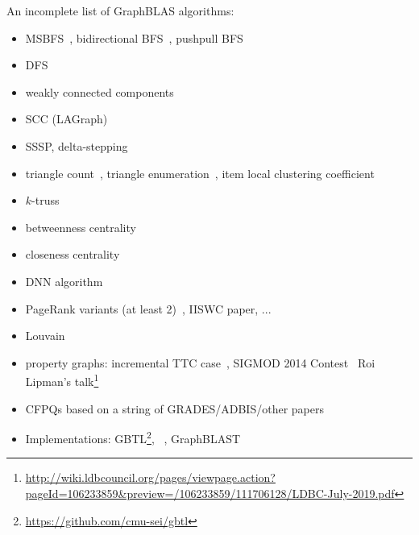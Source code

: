 An incomplete list of GraphBLAS algorithms:

\begin{itemize}
\item MSBFS~\cite{HPEC2020Contest}, bidirectional BFS~\cite{HPEC2020Contest}, pushpull BFS~\cite{DBLP:conf/icpp/YangBO18}

\item DFS~\cite{DBLP:conf/pldi/SpampinatoSL19}

\item weakly connected components~\cite{DBLP:conf/ppsc/ZhangAH20}

\item SCC (LAGraph)

\item SSSP, delta-stepping~\cite{DBLP:conf/ipps/SridharBMSLM19}

\item triangle count~\cite{DBLP:conf/ipps/AzadBG15,DBLP:conf/hpec/Davis18},
triangle enumeration~\cite{DBLP:conf/ipps/AzadBG15},
item local clustering coefficient~\cite{DBLP:conf/siamcsc/AznavehC0HKMS20}

\item $k$-truss~\cite{DBLP:conf/hpec/Davis18}

\item betweenness centrality~\cite{DBLP:conf/ipps/MattsonDKBMMY19}

\item closeness centrality~\cite{HPEC2020Contest}

\item DNN algorithm~\cite{DBLP:conf/hpec/KepnerKMPST17,DBLP:conf/hpec/0001AK19}

\item PageRank variants (at least 2)~\cite{DBLP:conf/siamcsc/AznavehC0HKMS20}, IISWC paper, ...

\item Louvain~\cite{DBLP:conf/ipps/LowSMP20}

\item property graphs:
incremental TTC case~\cite{DBLP:conf/ipps/ElekesS20},
SIGMOD 2014 Contest~\cite{HPEC2020Contest}
Roi Lipman's talk\footnote{\url{http://wiki.ldbcouncil.org/pages/viewpage.action?pageId=106233859&preview=/106233859/111706128/LDBC-July-2019.pdf}}

\item CFPQs based on a string of GRADES/ADBIS/other papers~\cite{DBLP:conf/grades/AzimovG18,DBLP:journals/pcs/AzimovG19,DBLP:conf/grades/MishinSSKNGG19,DBLP:conf/sigmod/TerekhovKAG20,DBLP:conf/adbis/OrachevEAG20}

\item Implementations:
GBTL\footnote{\url{https://github.com/cmu-sei/gbtl}},
\gxb~\cite{DBLP:journals/toms/Davis19},
GraphBLAST~\cite{DBLP:journals/corr/abs-1908-01407}
\end{itemize}
